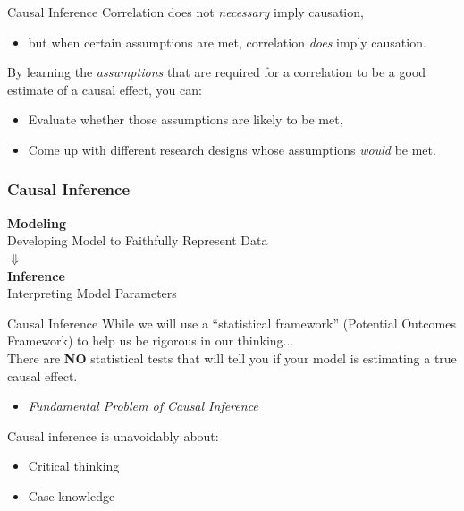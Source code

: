 \documentclass[11pt]{beamer}
\begin{document}
\begin{frame}[c]{Causal Inference}
Correlation does not \emph{necessary} imply causation, 
\begin{itemize}
  \pause \item  but when certain assumptions are met, correlation \emph{does} imply causation. 
\end{itemize} 
\vspace*{0.2cm}
\pause By learning the \emph{assumptions} that are required for a correlation to be a good estimate of a causal effect, you can:
\begin{itemize}
  \pause \item Evaluate whether those assumptions are likely to be met,
  \pause \item Come up with different research designs whose assumptions \emph{would} be met. 
\end{itemize}
\end{frame}

\begin{frame}[c]
  \frametitle{Causal Inference}
  \centering
  \textbf{Modeling} \\
  Developing Model to Faithfully Represent Data \\
  \vspace*{1cm}
  $\Downarrow$ \\
  \vspace*{1cm}
   \alert<2->{\textbf{Inference}} \\
  \alert<2->{Interpreting Model Parameters}
\end{frame}

\begin{frame}[c]{Causal Inference}
While we will use a ``statistical framework'' (Potential Outcomes Framework) to help us be rigorous in our thinking... \\
\vspace*{0.2cm}
\pause There are \textbf{NO} statistical tests that will tell you if your model is estimating a true causal effect. \\
\begin{itemize}
  \pause \item \emph{Fundamental Problem of Causal Inference}
\end{itemize}
\vspace*{0.2cm}
\pause Causal inference is \alert{unavoidably} about: 
\begin{itemize}
  \item Critical thinking
  \item Case knowledge
\end{itemize}
\end{frame}
\end{document}

